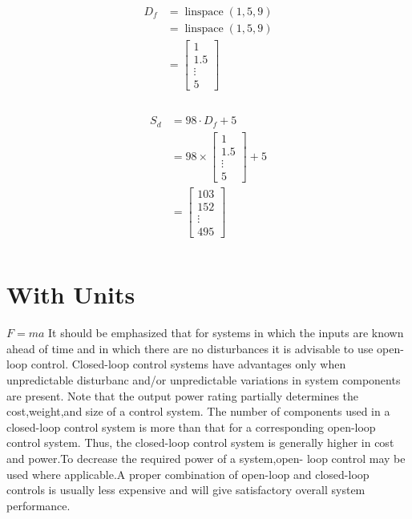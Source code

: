 \documentclass{report}
\begin{document}
\begin{align}
\begin{split}
D_{f}	&= \operatorname{linspace}{\left (1,5,9 \right )}\\
		&= \operatorname{linspace}{\left (1,5,9 \right )}\\
		&= \left[\begin{matrix}1\\1.5\\\vdots\\5\end{matrix}\right]\\
\end{split}
\end{align}

\begin{align}
\begin{split}
S_{d}	&= 98 \cdot D_{f} + 5\\
		&= 98 \times \left[\begin{matrix}1\\1.5\\\vdots\\5\end{matrix}\right] + 5\\
		&= \left[\begin{matrix}103\\152\\\vdots\\495\end{matrix}\right]\\
\end{split}
\end{align}

\section{With Units}
$F = ma$ It should be emphasized that for systems in which the inputs are known ahead of time and in which there are no disturbances it is advisable to use open-loop control.  Closed-loop control systems have advantages only when unpredictable disturbanc  and/or unpredictable variations in system components are present. Note that the  output power rating partially determines the cost,weight,and size of a control system.  The number of components used in a closed-loop control system is more than that for  a corresponding open-loop control system. Thus, the closed-loop control system is generally higher in cost and power.To decrease the required power of a system,open-  loop control may be used where applicable.A proper combination of open-loop and  closed-loop controls is usually less expensive and will give satisfactory overall system  performance.
\end{document}
